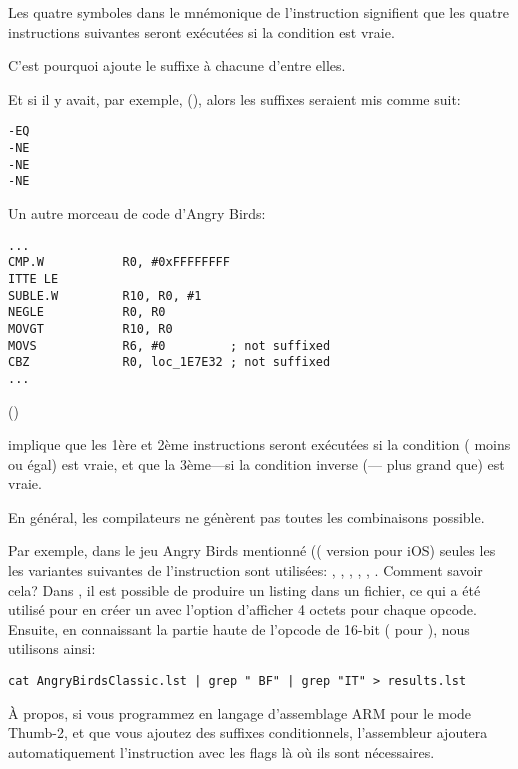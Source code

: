 Les quatre symboles  dans le mnémonique de l'instruction signifient que les quatre
instructions suivantes seront exécutées si la condition est vraie.

C'est pourquoi \IDA ajoute le suffixe  à chacune d'entre elles.

Et si il y avait, par exemple,  (),
alors les suffixes seraient mis comme suit:

\begin{lstlisting}
-EQ
-NE
-NE
-NE
\end{lstlisting}

Un autre morceau de code d'Angry Birds:

\begin{lstlisting}[caption=Angry Birds Classic,style=customasmARM]
...
CMP.W           R0, #0xFFFFFFFF
ITTE LE
SUBLE.W         R10, R0, #1
NEGLE           R0, R0
MOVGT           R10, R0
MOVS            R6, #0         ; not suffixed
CBZ             R0, loc_1E7E32 ; not suffixed
...
\end{lstlisting}

 ()

implique que les 1ère et 2ème instructions seront exécutées si la condition 
( moins ou égal) est vraie, et que la 3ème---si la condition inverse
(--- plus grand que) est vraie.

En général, les compilateurs ne génèrent pas toutes les combinaisons possible.

Par exemple, dans le jeu Angry Birds mentionné (( version pour iOS)
seules les les variantes suivantes de l'instruction  sont utilisées:
, , , , , .
\myindex{\GrepUsage}
Comment savoir cela?
Dans \IDA, il est possible de produire un listing dans un fichier, ce qui a été utilisé
pour en créer un avec l'option d'afficher 4 octets pour chaque opcode.
Ensuite, en connaissant la partie haute de l'opcode de 16-bit ( pour ),
nous utilisons  ainsi:

\begin{lstlisting}
cat AngryBirdsClassic.lst | grep " BF" | grep "IT" > results.lst
\end{lstlisting}


À propos, si vous programmez en langage d'assemblage ARM pour le mode Thumb-2, et
que vous ajoutez des suffixes conditionnels, l'assembleur ajoutera automatiquement
l'instruction  avec les flags là où ils sont nécessaires.

